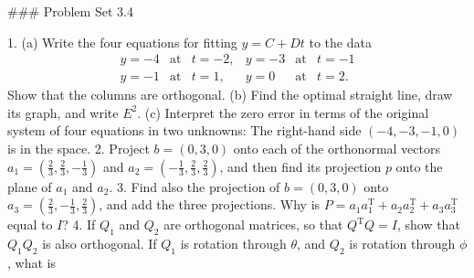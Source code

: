 

### Problem Set 3.4

1. (a) Write the four equations for fitting \(y=C+Dt\) to the data \[\begin{array}{llll}y=-4&\text{at}&t=-2,&y=-3&\text{at}&t=-1\\ y=-1&\text{at}&t=1,&y=0&\text{at}&t=2.\end{array}\] Show that the columns are orthogonal. (b) Find the optimal straight line, draw its graph, and write \(E^{2}\). (c) Interpret the zero error in terms of the original system of four equations in two unknowns: The right-hand side \((-4,-3,-1,0)\) is in the space.
2. Project \(b=(0,3,0)\) onto each of the orthonormal vectors \(a_{1}=(\frac{2}{3},\frac{2}{3},-\frac{1}{3})\) and \(a_{2}=(-\frac{1}{3},\frac{2}{3},\frac{2}{3})\), and then find its projection \(p\) onto the plane of \(a_{1}\) and \(a_{2}\).
3. Find also the projection of \(b=(0,3,0)\) onto \(a_{3}=(\frac{2}{3},-\frac{1}{3},\frac{2}{3})\), and add the three projections. Why is \(P=a_{1}a_{1}^{\mathrm{T}}+a_{2}a_{2}^{\mathrm{T}}+a_{3}a_{3}^{\mathrm{T}}\) equal to \(I\)?
4. If \(Q_{1}\) and \(Q_{2}\) are orthogonal matrices, so that \(Q^{\mathrm{T}}Q=I\), show that \(Q_{1}Q_{2}\) is also orthogonal. If \(Q_{1}\) is rotation through \(\theta\), and \(Q_{2}\) is rotation through \(\phi\), what is